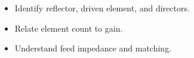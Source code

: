 \begin{objectives}
\begin{itemize}[leftmargin=1.4em,itemsep=2pt]
\item Identify reflector, driven element, and directors.
\item Relate element count to gain.
\item Understand feed impedance and matching.
\end{itemize}
\end{objectives}
